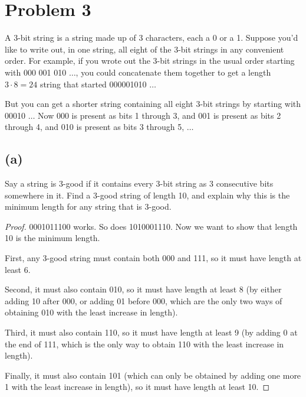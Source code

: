 \documentclass[14pt]{extarticle}
\begin{document}
\section{Problem 3}
A 3-bit string is a string made up of 3 characters, each a 0 or a 1. Suppose you’d like to write out, in one string, all eight of the 3-bit strings in any convenient order. For example, if you wrote out the 3-bit strings in the usual order starting with 000 001 010 $\ldots$, you could concatenate them together to get a length $3 \cdot 8 = 24$ string that started 000001010 $\ldots$

But you can get a shorter string containing all eight 3-bit strings by starting with 00010 $\ldots$ Now 000 is present as bits 1 through 3, and 001 is present as bits 2 through 4, and 010 is present as bits 3 through 5, $\ldots$
\subsection{(a)}
Say a string is 3-good if it contains every 3-bit string as 3 consecutive bits somewhere in it. Find a 3-good string of length 10, and explain why this is the minimum length for any string that is 3-good.
\begin{proof}
0001011100 works. So does 1010001110. Now we want to show that length 10 is the minimum length. 

First, any 3-good string must contain both 000 and 111, so it must have length at least 6. 

Second, it must also contain 010, so it must have length at least 8 (by either adding 10 after 000, or adding 01 before 000, which are the only two ways of obtaining 010 with the least increase in length).

Third, it must also contain 110, so it must have length at least 9 (by adding 0 at the end of 111, which is the only way to obtain 110 with the least increase in length).

Finally, it must also contain 101 (which can only be obtained by adding one more 1 with the least increase in length), so it must have length at least 10.
\end{proof}
\end{document}
